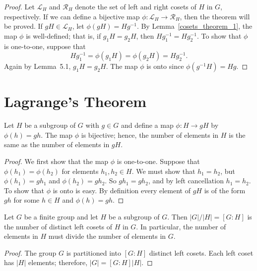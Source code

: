  
\begin{proof}
Let ${\mathcal L}_H$\label{notesetleft} and  ${\mathcal R}_H$\label{notesetright} denote the set of left and right cosets of $H$ in $G$, respectively.  If we can define a bijective map $\phi :  {\mathcal L}_H \rightarrow {\mathcal R}_H$, then the theorem will be proved.  If $gH \in {\mathcal L}_H$, let $\phi( gH ) = Hg^{-1}$.  By Lemma~\ref{cosets_theorem_1}, the map $\phi$ is well-defined; that is, if $g_1 H = g_2 H$, then $H g_1^{-1} = H g_2^{-1}$.  To show that $\phi$ is one-to-one, suppose that 
$$
H g_1^{-1} = \phi( g_1 H ) = \phi( g_2 H ) = H g_2^{-1}.
$$
Again by Lemma~5.1, $g_1 H = g_2 H$.  The map $\phi$ is onto since $\phi(g^{-1} H ) = H g$. 
\hspace*{1in}
\end{proof}
 
 
\section{Lagrange's Theorem}

\begin{proposition}\label{cosets_theorem_4}
Let $H$ be a subgroup of $G$ with $g \in G$ and define a map $\phi:H \rightarrow gH$ by $\phi(h) = gh$.  The map $\phi$ is bijective; hence, the number of elements in $H$ is the same as the number of elements in $gH$. 
\end{proposition}
 
\begin{proof}
We first show that the map $\phi$ is one-to-one.  Suppose that $\phi(h_1)  = \phi(h_2)$ for elements $h_1, h_2 \in H$.  We must show that $h_1 =  h_2$, but $\phi(h_1) = gh_1$ and $\phi(h_2) = gh_2$.  So $gh_1 = gh_2$,  and by left cancellation $h_1= h_2$.  To show that $\phi$ is onto is easy.  By definition every element of $gH$ is of the form $gh$ for some $h \in H$ and $\phi(h) = gh$. 
\end{proof}

\begin{theorem}[Lagrange]\label{cosets_theorem_5}
Let $G$ be a finite group and let $H$ be a subgroup of $G$.  Then $|G|/|H| = [G : H]$ is the number of distinct left cosets of $H$ in $G$.  In particular, the number of elements in $H$ must divide the number of elements in $G$. 
\end{theorem}

\begin{proof}
The group $G$ is partitioned into $[G : H]$ distinct left cosets.  Each left coset has $|H|$ elements; therefore, $|G| = [G : H] |H|$.
\end{proof}

